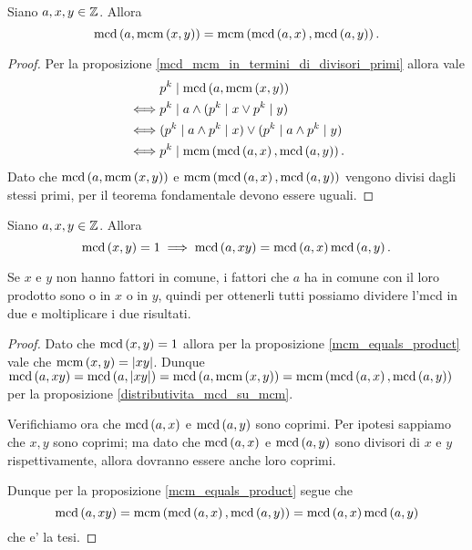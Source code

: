 \begin{proposition} \label{distributivita_mcd_su_mcm}
    Siano $a, x, y \in \mathbb{Z}$. Allora 
    \begin{equation}
        \operatorname{mcd}\left(a, \operatorname{mcm}\left(x, y\right)\right) = \operatorname{mcm}\left(\operatorname{mcd}\left(a, x\right), \operatorname{mcd}\left(a, y\right)\right).
    \end{equation}
\end{proposition}
\begin{proof}
    Per la proposizione \ref{mcd_mcm_in_termini_di_divisori_primi} allora vale
    \begin{alignat*}
        {1}
        &p^k \mid \operatorname{mcd}\left(a, \operatorname{mcm}\left(x, y\right)\right)\\ 
        \iff &p^k \mid a \land (p^k \mid x \lor p^k \mid y)\\
        \iff &(p^k \mid a \land p^k \mid x) \lor (p^k \mid a \land p^k \mid y) \\
        \iff &p^k \mid \operatorname{mcm}\left(\operatorname{mcd}\left(a, x\right), \operatorname{mcd}\left(a, y\right)\right).
    \end{alignat*}
    Dato che $\operatorname{mcd}\left(a, \operatorname{mcm}\left(x, y\right)\right)$ e $\operatorname{mcm}\left(\operatorname{mcd}\left(a, x\right), \operatorname{mcd}\left(a, y\right)\right)$ vengono divisi dagli stessi primi, per il teorema fondamentale devono essere uguali.
\end{proof}

\begin{proposition}
    Siano $a, x, y \in \mathbb{Z}$. Allora 
    \begin{equation}
        \operatorname{mcd}\left(x, y\right) = 1 \implies \operatorname{mcd}\left(a, xy\right) = \operatorname{mcd}\left(a, x\right)\operatorname{mcd}\left(a, y\right).
    \end{equation}
\end{proposition}
\begin{intuition}
    Se $x$ e $y$ non hanno fattori in comune, i fattori che $a$ ha in comune con il loro prodotto sono o in $x$ o in $y$, quindi per ottenerli tutti possiamo dividere l'mcd in due e moltiplicare i due risultati.
\end{intuition}
\begin{proof}
    Dato che $\operatorname{mcd}\left(x, y\right) = 1$ allora per la proposizione \ref{mcm_equals_product} vale che $\operatorname{mcm}\left(x, y\right) = \left|xy\right|$.
    Dunque $\operatorname{mcd}\left(a, xy\right) = \operatorname{mcd}\left(a, \left|xy\right|\right) = \operatorname{mcd}\left(a, \operatorname{mcm}\left(x, y\right)\right) = \operatorname{mcm}\left(\operatorname{mcd}\left(a, x\right), \operatorname{mcd}\left(a, y\right)\right)$ per la proposizione \ref{distributivita_mcd_su_mcm}.

    Verifichiamo ora che $\operatorname{mcd}\left(a, x\right)$ e $\operatorname{mcd}\left(a, y\right)$ sono coprimi. Per ipotesi sappiamo che $x, y$ sono coprimi; ma dato che $\operatorname{mcd}\left(a, x\right)$ e $\operatorname{mcd}\left(a, y\right)$ sono divisori di $x$ e $y$ rispettivamente, allora dovranno essere anche loro coprimi.

    Dunque per la proposizione \ref{mcm_equals_product} segue che \[
        \operatorname{mcd}\left(a, xy\right) = \operatorname{mcm}\left(\operatorname{mcd}\left(a, x\right), \operatorname{mcd}\left(a, y\right)\right) = \operatorname{mcd}\left(a, x\right)\operatorname{mcd}\left(a, y\right)
    \] che e' la tesi.
\end{proof}


